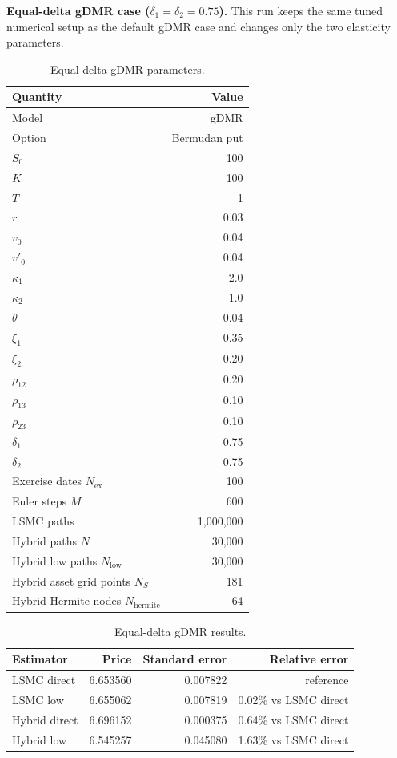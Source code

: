 \documentclass[11pt]{article}
\begin{document}
\textbf{Equal-delta gDMR case ($\delta_1=\delta_2=0.75$).} This run keeps the same tuned numerical
setup as the default gDMR case and changes only the two elasticity parameters.

\begin{table}[H]
\centering
\caption{Equal-delta gDMR parameters.}
\begin{tabular}{lr}
\toprule
Quantity & Value \\
\midrule
Model & gDMR \\
Option & Bermudan put \\
$S_0$ & 100 \\
$K$ & 100 \\
$T$ & 1 \\
$r$ & 0.03 \\
$v_0$ & 0.04 \\
$v'_0$ & 0.04 \\
$\kappa_1$ & 2.0 \\
$\kappa_2$ & 1.0 \\
$\theta$ & 0.04 \\
$\xi_1$ & 0.35 \\
$\xi_2$ & 0.20 \\
$\rho_{12}$ & 0.20 \\
$\rho_{13}$ & 0.10 \\
$\rho_{23}$ & 0.10 \\
$\delta_1$ & 0.75 \\
$\delta_2$ & 0.75 \\
Exercise dates $N_{\mathrm{ex}}$ & 100 \\
Euler steps $M$ & 600 \\
LSMC paths & 1,000,000 \\
Hybrid paths $N$ & 30,000 \\
Hybrid low paths $N_{\mathrm{low}}$ & 30,000 \\
Hybrid asset grid points $N_S$ & 181 \\
Hybrid Hermite nodes $N_{\mathrm{hermite}}$ & 64 \\
\bottomrule
\end{tabular}
\end{table}

\begin{table}[H]
\centering
\caption{Equal-delta gDMR results.}
\begin{tabular}{lrrr}
\toprule
Estimator & Price & Standard error & Relative error \\
\midrule
LSMC direct   & 6.653560 & 0.007822 & reference \\
LSMC low      & 6.655062 & 0.007819 & 0.02\% vs LSMC direct \\
Hybrid direct & 6.696152 & 0.000375 & 0.64\% vs LSMC direct \\
Hybrid low    & 6.545257 & 0.045080 & 1.63\% vs LSMC direct \\
\bottomrule
\end{tabular}
\end{table}
\end{document}
